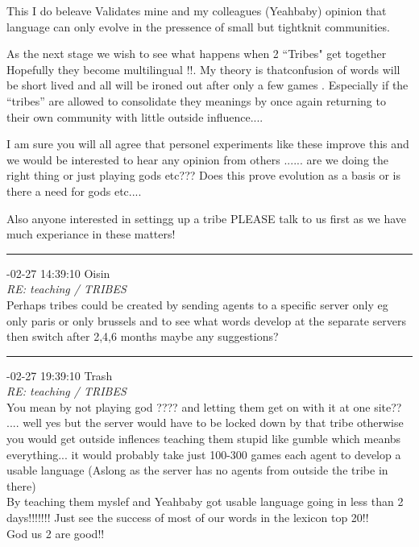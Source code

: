 \begin{mail}
This I do beleave Validates mine and my colleagues (Yeahbaby) opinion that language can only evolve in the pressence of small but tightknit communities.

As the next stage we wish to see what happens when 2 ``Tribes" get together Hopefully they become multilingual !!.
My theory is thatconfusion of words will be short lived and all will be ironed out after only a few games . Especially if the ``tribes'' are allowed to consolidate they meanings by once again returning to their own community with little outside  influence....

I am sure you will all agree that personel experiments like these improve this and we would be interested to hear any opinion from others ...... are we doing the right thing or just playing gods etc???
 Does this prove evolution as a basis or is there a need for gods etc.... 

Also anyone interested in settingg up a tribe PLEASE talk to us first as we have much experiance in these matters!\\

\rule{0.8\textwidth}{.4pt}

{-02-27 14:39:10 Oisin}\\
{\itshape RE: teaching / TRIBES}\\
Perhaps tribes could be created by sending agents to a specific server only eg only paris or only brussels and to see what words develop at the separate servers then switch after 2,4,6 months maybe any suggestions?\\

\rule{0.8\textwidth}{.4pt}

{-02-27 19:39:10 Trash}\\
{\itshape RE: teaching / TRIBES}\\
You mean by not playing god ???? and letting them get on with it at one site?? .... well yes but the server would have to be locked down by that tribe otherwise you would get outside inflences teaching them stupid like gumble which meanbs everything... it would probably take just 100-300 games each agent to develop a usable language (Aslong as the server has no agents from outside the  tribe in there)\\
By teaching them myslef and Yeahbaby got usable language going in  less than 2 days!!!!!!! Just see the success of most of our words in the lexicon top 20!!\\ \enlargethispage{2\baselineskip}
God us 2 are good!!\\


\end{mail}
